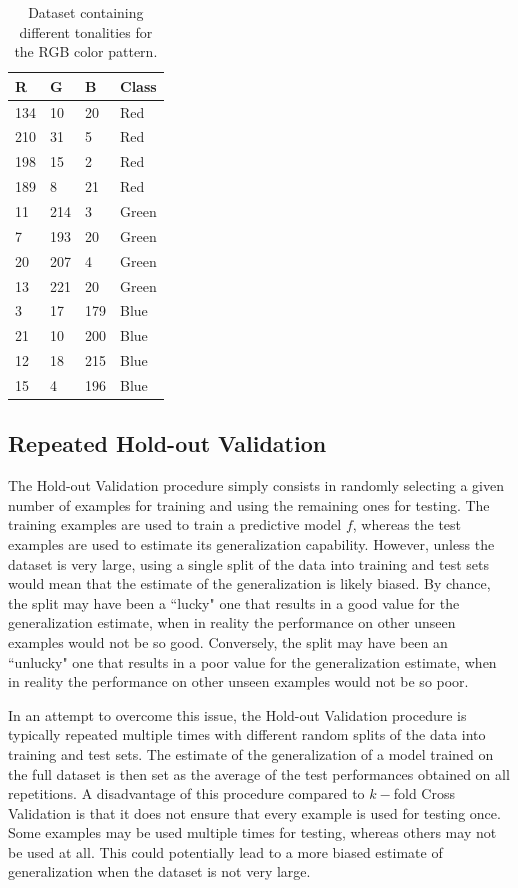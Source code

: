 \begin{table}[]
    \centering
\caption{Dataset containing different tonalities for the RGB color pattern.}
\begin{tabular}{ |p{1cm}|p{1cm}|p{1cm}|p{2cm}| } 
\hline
R & G & B & Class \\
\hline
134 & 10 & 20 & Red \\
\hline
210 & 31 & 5 & Red \\
\hline
198 & 15 & 2 & Red \\
\hline
189 & 8 & 21 & Red \\
\hline
11 & 214 & 3 & Green \\
\hline
7 & 193 & 20 & Green \\
\hline
20 & 207 & 4 & Green \\
\hline
13 & 221 & 20 & Green \\
\hline
3 & 17 & 179 & Blue \\
\hline
21 & 10 & 200 & Blue \\
\hline
12 & 18 & 215 & Blue \\
\hline
15 & 4 & 196 & Blue \\
 \hline
\end{tabular}
\label{tab:dsloocv}
\end{table}


\subsection{Repeated Hold-out Validation}
\label{sec:holdout}

The Hold-out Validation procedure simply consists in randomly selecting a given number of examples for training and using the remaining ones for testing. The training examples are used to train a predictive model $f$, whereas the test examples are used to estimate its generalization capability. However, unless the dataset is very large, using a single split of the data into training and test sets would mean that the estimate of the generalization is likely biased. By chance, the split may have been a ``lucky" one that results in a good value for the generalization estimate, when in reality the performance on other unseen examples would not be so good. Conversely, the split may have been an ``unlucky" one that results in a poor value for the generalization estimate, when in reality the performance on other unseen examples would not be so poor. 

In an attempt to overcome this issue, the Hold-out Validation procedure is typically repeated multiple times with different random splits of the data into training and test sets. The estimate of the generalization of a model trained on the full dataset is then set as the average of the test performances obtained on all repetitions. A disadvantage of this procedure compared to $k-$fold Cross Validation is that it does not ensure that every example is used for testing once. Some examples may be used multiple times for testing, whereas others may not be used at all. This could potentially lead to a more biased estimate of generalization when the dataset is not very large.

